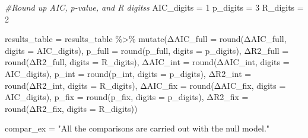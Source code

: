\documentclass[
]{article}
\newenvironment{Shaded}{\begin{snugshade}}{\end{snugshade}}
\newcommand{\AttributeTok}[1]{\textcolor[rgb]{0.77,0.63,0.00}{#1}}
\newcommand{\CommentTok}[1]{\textcolor[rgb]{0.56,0.35,0.01}{\textit{#1}}}
\newcommand{\DecValTok}[1]{\textcolor[rgb]{0.00,0.00,0.81}{#1}}
\newcommand{\FunctionTok}[1]{\textcolor[rgb]{0.00,0.00,0.00}{#1}}
\newcommand{\NormalTok}[1]{#1}
\newcommand{\OtherTok}[1]{\textcolor[rgb]{0.56,0.35,0.01}{#1}}
\newcommand{\SpecialCharTok}[1]{\textcolor[rgb]{0.00,0.00,0.00}{#1}}
\newcommand{\StringTok}[1]{\textcolor[rgb]{0.31,0.60,0.02}{#1}}
\begin{document}
\begin{Shaded}
\begin{Highlighting}[]
\CommentTok{\#Round up AIC, p{-}value, and R digitss}
\NormalTok{AIC\_digits }\OtherTok{=} \DecValTok{1}
\NormalTok{p\_digits }\OtherTok{=} \DecValTok{3}
\NormalTok{R\_digits }\OtherTok{=} \DecValTok{2}

\NormalTok{results\_table }\OtherTok{=}\NormalTok{ results\_table }\SpecialCharTok{\%\textgreater{}\%}
  \FunctionTok{mutate}\NormalTok{(Δ}\AttributeTok{AIC\_full =} \FunctionTok{round}\NormalTok{(ΔAIC\_full, }\AttributeTok{digits =}\NormalTok{ AIC\_digits),}
         \AttributeTok{p\_full =} \FunctionTok{round}\NormalTok{(p\_full, }\AttributeTok{digits =}\NormalTok{ p\_digits),}
\NormalTok{         Δ}\AttributeTok{R2\_full =} \FunctionTok{round}\NormalTok{(ΔR2\_full, }\AttributeTok{digits =}\NormalTok{ R\_digits),}
\NormalTok{         Δ}\AttributeTok{AIC\_int =} \FunctionTok{round}\NormalTok{(ΔAIC\_int, }\AttributeTok{digits =}\NormalTok{ AIC\_digits),}
         \AttributeTok{p\_int =} \FunctionTok{round}\NormalTok{(p\_int, }\AttributeTok{digits =}\NormalTok{ p\_digits),}
\NormalTok{         Δ}\AttributeTok{R2\_int =} \FunctionTok{round}\NormalTok{(ΔR2\_int, }\AttributeTok{digits =}\NormalTok{ R\_digits),}
\NormalTok{         Δ}\AttributeTok{AIC\_fix =} \FunctionTok{round}\NormalTok{(ΔAIC\_fix, }\AttributeTok{digits =}\NormalTok{ AIC\_digits),}
         \AttributeTok{p\_fix =} \FunctionTok{round}\NormalTok{(p\_fix, }\AttributeTok{digits =}\NormalTok{ p\_digits),}
\NormalTok{         Δ}\AttributeTok{R2\_fix =} \FunctionTok{round}\NormalTok{(ΔR2\_fix, }\AttributeTok{digits =}\NormalTok{ R\_digits))}

\NormalTok{compar\_ex }\OtherTok{=} \StringTok{"All the comparisons are carried out with the null model."}
\end{Highlighting}
\end{Shaded}
\end{document}
